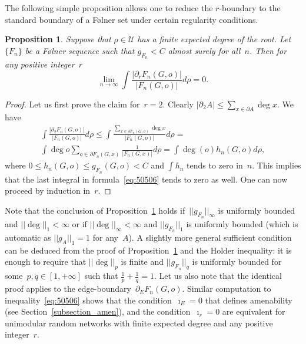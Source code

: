\documentclass[english]{article}
\newtheorem{proposition}[lemma]{Proposition}
\theoremstyle{definition}
\begin{document}
The following simple proposition allows one to reduce the $r$-boundary to the standard boundary of a F\o lner set under certain regularity conditions. 
\begin{proposition}\label{proposition:rFolnler}%
    Suppose that $\rho \in \mathcal{U}$ has a finite expected degree of the root. Let $\{F_n\}$ be a F\o lner sequence such that $g_{F_n}< C$ almost surely for all~$n$. Then for any positive integer~$r$
    $$
    \lim_{n \to \infty} \int \frac{|\partial_r F_n (G,o)|}{|F_n(G,o)|} d\rho= 0.
    $$
\end{proposition}
\begin{proof}
    Let us first prove the claim for~$r = 2$. Clearly $|\partial_2 A| \le \sum_{x \in \partial A} \deg x$. We have 
    \begin{multline}\label{eq:50506}
         \int \frac{|\partial_2 F_n (G,o)|}{|F_n(G,o)|} d\rho \le 
         \int \frac{\sum_{x \in \partial F_n(G,o)} \deg x}{|F_n(G,o)|} d\rho = \\
         \int \deg o\sum_{o \in \partial F_n(G,x)} \frac{1}{|F_n(G,x)|} d\rho = 
         \int \deg (o) h_n(G,o) d\rho,
    \end{multline}
    where $0\le h_n(G,o) \le g_{F_n}(G,o) < C$ and $\int h_n$ tends to zero in~$n$. This implies that the last integral in formula~\eqref{eq:50506} tends to zero as well. 
One can now proceed by induction in~$r$.
\end{proof}
Note that the conclusion of Proposition~\ref{proposition:rFolnler} holds if~$||g_{F_n}||_\infty$ is uniformly bounded and $||\deg||_1 < \infty$ or if $||\deg ||_\infty < \infty$ and $||g_{F_n}||_1$ is uniformly bounded (which is automatic as $||g_{A}||_1 = 1$ for any~$A$). A slightly more general sufficient condition can be deduced from the proof of Proposition~\ref{proposition:rFolnler} and the Holder inequality: it is enough to require that $||\deg||_p$ is finite and $||g_{F_n}||_q$ is uniformly bounded for some~$p, q \in [1, +\infty]$ such that $\frac{1}{p} + \frac{1}{q} = 1$. Let us also note that the identical  proof applies to the {edge-boundary}~$\partial_E F_n(G,o)$.
Similar computation to inequality~\eqref{eq:50506} shows that the condition~$\imath_E= 0$ that defines amenability (see Section~\ref{subsection_amen}), and the condition~$\imath_r =0$ are equivalent for unimodular random networks with finite expected degree and any positive integer~$r$.
\end{document}
